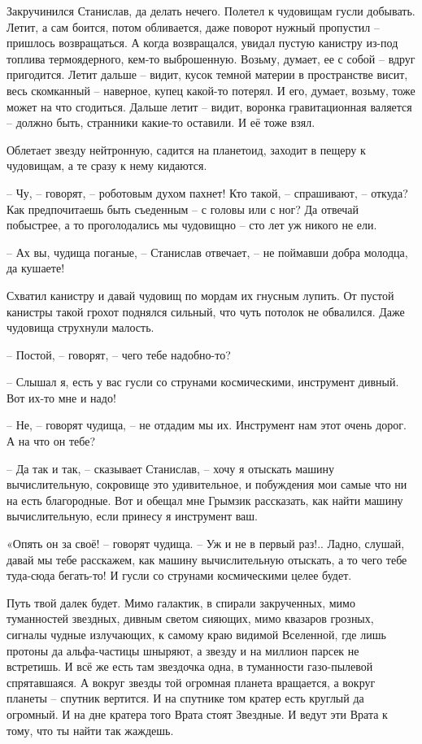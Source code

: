 \documentclass[ebook,oneside,final,openright]{memoir}
\begin{document}
Закручинился Станислав, да делать нечего. Полетел к чудовищам гусли добывать. Летит, а сам боится, потом обливается, даже поворот нужный пропустил – пришлось возвращаться. А когда возвращался, увидал пустую канистру из-под топлива термоядерного, кем-то выброшенную. Возьму, думает, ее с собой – вдруг пригодится. Летит дальше – видит, кусок темной материи в пространстве висит, весь скомканный – наверное, купец какой-то потерял. И его, думает, возьму, тоже может на что сгодиться. Дальше летит – видит, воронка гравитационная валяется – должно быть, странники какие-то оставили. И её тоже взял.\par
\par
Облетает звезду нейтронную, садится на планетоид, заходит в пещеру к чудовищам, а те сразу к нему кидаются. \par
– Чу, – говорят, – роботовым духом пахнет! Кто такой, – спрашивают, – откуда? Как предпочитаешь быть съеденным – с головы или с ног? Да отвечай побыстрее, а то проголодались мы чудовищно – сто лет уж никого не ели.\par
– Ах вы, чудища поганые, – Станислав отвечает, – не поймавши добра молодца, да кушаете! \par
Схватил канистру и давай чудовищ по мордам их гнусным лупить. От пустой канистры такой грохот поднялся сильный, что чуть потолок не обвалился. Даже чудовища струхнули малость. \par
– Постой, – говорят, – чего тебе надобно-то?\par
– Слышал я, есть у вас гусли со струнами космическими, инструмент дивный. Вот их-то мне и надо!\par
– Не, – говорят чудища, – не отдадим мы их. Инструмент нам этот очень дорог. А на что он тебе? \par
– Да так и так, – сказывает Станислав, – хочу я отыскать машину вычислительную, сокровище это удивительное, и побуждения мои самые что ни на есть благородные. Вот и обещал мне Грымзик рассказать, как найти машину вычислительную, если принесу я инструмент ваш. \par
\par
«Опять он за своё! – говорят чудища. – Уж и не в первый раз!.. Ладно, слушай, давай мы тебе расскажем, как машину вычислительную отыскать, а то чего тебе туда-сюда бегать-то! И гусли со струнами космическими целее будет. \par
\par
Путь твой далек будет. Мимо галактик, в спирали закрученных, мимо туманностей звездных, дивным светом сияющих, мимо квазаров грозных, сигналы чудные излучающих, к самому краю видимой Вселенной, где лишь протоны да альфа-частицы шныряют, а звезду и на миллион парсек не встретишь. И всё же есть там звездочка одна, в туманности газо-пылевой спрятавшаяся. А вокруг звезды той огромная планета вращается, а вокруг планеты – спутник вертится. И на спутнике том кратер есть круглый да огромный. И на дне кратера того Врата стоят Звездные. И ведут эти Врата к тому, что ты найти так жаждешь.\par
\end{document}
